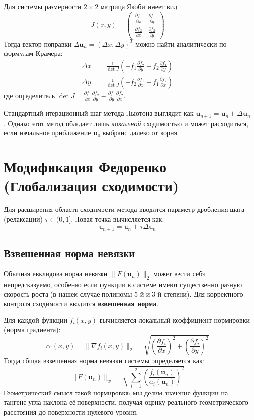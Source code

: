 \documentclass[12pt, a4paper]{article}
\theoremstyle{definition}
\begin{document}
Для системы размерности $2 \times 2$ матрица Якоби имеет вид:
\[
J(x, y) = \begin{pmatrix} 
\frac{\partial f_1}{\partial x} & \frac{\partial f_1}{\partial y} \\ 
\frac{\partial f_2}{\partial x} & \frac{\partial f_2}{\partial y} 
\end{pmatrix}
\]
Тогда вектор поправки $\Delta \bm{u}_n = (\Delta x, \Delta y)^T$ можно найти аналитически по формулам Крамера:
\begin{align*}
\Delta x &= \frac{1}{\det J} \left( -f_1 \frac{\partial f_2}{\partial y} + f_2 \frac{\partial f_1}{\partial y} \right) \\
\Delta y &= \frac{1}{\det J} \left( -f_2 \frac{\partial f_1}{\partial x} + f_1 \frac{\partial f_2}{\partial x} \right)
\end{align*}
где определитель $\det J = \frac{\partial f_1}{\partial x} \frac{\partial f_2}{\partial y} - \frac{\partial f_1}{\partial y} \frac{\partial f_2}{\partial x}$.

Стандартный итерационный шаг метода Ньютона выглядит как $\bm{u}_{n+1} = \bm{u}_n + \Delta \bm{u}_n$. Однако этот метод обладает лишь \textit{локальной} сходимостью и может расходиться, если начальное приближение $\bm{u}_0$ выбрано далеко от корня.

\section{Модификация Федоренко (Глобализация сходимости)}

Для расширения области сходимости метода вводится параметр дробления шага (релаксации) $\tau \in (0, 1]$. Новая точка вычисляется как:
\[
\bm{u}_{n+1} = \bm{u}_n + \tau \Delta \bm{u}_n
\]

\subsection{Взвешенная норма невязки}
Обычная евклидова норма невязки $\|F(\bm{u}_n)\|_2$ может вести себя непредсказуемо, особенно если функции в системе имеют существенно разную скорость роста (в нашем случае полиномы 5-й и 3-й степени). Для корректного контроля сходимости вводится \textbf{взвешенная норма}. 

Для каждой функции $f_i(x,y)$ вычисляется локальный коэффициент нормировки (норма градиента):
\[
\alpha_i(x, y) = \|\nabla f_i(x, y)\|_2 = \sqrt{ \left(\frac{\partial f_i}{\partial x}\right)^2 + \left(\frac{\partial f_i}{\partial y}\right)^2 }
\]
Тогда общая взвешенная норма невязки системы определяется как:
\[
\|F(\bm{u}_n)\|_{w} = \sqrt{ \sum_{i=1}^2 \left( \frac{f_i(\bm{u}_n)}{\alpha_i(\bm{u}_n)} \right)^2 }
\]
Геометрический смысл такой нормировки: мы делим значение функции на тангенс угла наклона её поверхности, получая оценку реального геометрического расстояния до поверхности нулевого уровня.
\end{document}
